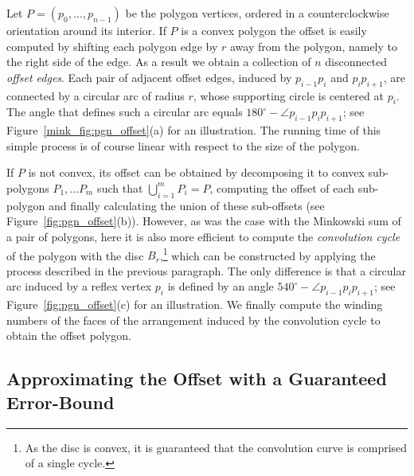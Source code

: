 Let $P = \left( p_0, \ldots, p_{n - 1} \right)$ be the polygon vertices,
ordered in a counterclockwise orientation around its interior. 
If $P$ is a convex polygon the offset is easily computed by
shifting each polygon edge by $r$ away from the polygon, namely to
the right side of the edge. As a result we obtain a collection of
$n$ disconnected \emph{offset edges}. Each pair of adjacent offset
edges, induced by $p_{i-1} p_i$ and $p_i p_{i+1}$, are connected
by a circular arc of radius $r$, whose supporting circle is
centered at $p_i$. The angle that defines such a circular arc
equals $180^{\circ} - \angle p_{i-1} p_i p_{i+1}$; see
Figure~\ref{mink_fig:pgn_offset}(a) for an illustration. The running
time of this simple process is of course linear with respect to
the size of the polygon.

If $P$ is not convex, its offset can be obtained by decomposing it
to convex sub-polygons $P_1, \ldots P_m$ such that
$\bigcup_{i=1}^{m}{P_i} = P$, computing the offset of each
sub-polygon and finally calculating the union of these sub-offsets
(see Figure~\ref{fig:pgn_offset}(b)). However, as was the case with
the Minkowski sum of a pair of polygons, here it is also more
efficient to compute the \emph{convolution cycle} of the polygon
with the disc $B_r$,\footnote{As the disc is convex, it is guaranteed
that the convolution curve is comprised of a single cycle.} which can be
constructed by applying the process described in the previous
paragraph. The only difference is that a circular arc induced by a
reflex vertex $p_i$ is defined by an angle $540^{\circ} - \angle
p_{i-1} p_i p_{i+1}$; see Figure~\ref{fig:pgn_offset}(c) for an
illustration. We finally compute the winding numbers of the faces of the
arrangement induced by the convolution cycle to obtain the offset
polygon.

\subsection{Approximating the Offset with a Guaranteed Error-Bound}
\label{mink_ssec:approx_offset}

